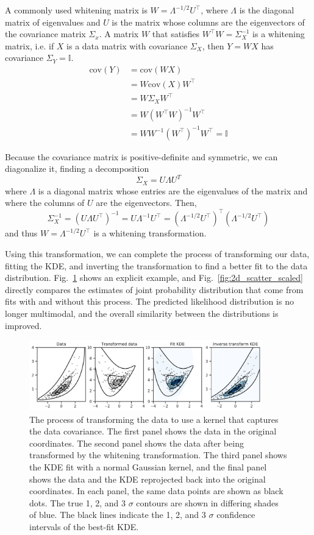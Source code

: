 A commonly used whitening matrix is $W = \Lambda^{-1/2}U^\top$, where $\Lambda$ is the diagonal matrix of eigenvalues and $U$ is the matrix whose columns are the eigenvectors of the covariance matrix $\Sigma_x$. A matrix $W$ that satisfies $W^\top W=\Sigma_X^{-1}$ is a whitening matrix, i.e. if $X$ is a data matrix with covariance $\Sigma_X$, then $Y=WX$ has covariance $\Sigma_Y=\mathbb{I}$.
\begin{align*}
    \textrm{cov}(Y) & = \textrm{cov}(WX)\\
    & = W\textrm{cov}(X)W^\top \\
    & = W\Sigma_X W^\top \\
    & = W(W^\top W)^{-1}W^\top \\
    & = WW^{-1}(W^\top)^{-1}W^\top = \mathbb{I}
\end{align*}

Because the covariance matrix is positive-definite and symmetric, we can diagonalize it, finding a decomposition
$$\Sigma_X = U\Lambda U^T$$
where $\Lambda$ is a diagonal matrix whose entries are the eigenvalues of the matrix and where the columns of $U$ are the eigenvectors. Then,
$$\Sigma_X^{-1}=(U\Lambda U^\top)^{-1} = U\Lambda^{-1}U^\top = (\Lambda^{-1/2}U^\top)^\top(\Lambda^{-1/2}U^\top)$$
and thus $W = \Lambda^{-1/2}U^\top$ is a whitening transformation.

Using this transformation, we can complete the process of transforming our data, fitting the KDE, and inverting the transformation to find a better fit to the data distribution. Fig.~\ref{fig:2d_rescaling_process} shows an explicit example, and Fig.~\ref{fig:2d_scatter_scaled} directly compares the estimates of joint probability distribution that come from fits with and without this process. The predicted likelihood distribution is no longer multimodal, and the overall similarity between the distributions is improved.

\begin{figure}
    \centering
    \includegraphics[width=0.9\textwidth]{figures/snemo_kde/2d_rescaling_process.pdf}
    \caption{The process of transforming the data to use a kernel that captures the data covariance. The first panel shows the data in the original coordinates. The second panel shows the data after being transformed by the whitening transformation. The third panel shows the KDE fit with a normal Gaussian kernel, and the final panel shows the data and the KDE reprojected back into the original coordinates. In each panel, the same data points are shown as black dots. The true 1, 2, and 3 $\sigma$ contours are shown in differing shades of blue. The black lines indicate the 1, 2, and 3 $\sigma$ confidence intervals of the best-fit KDE.}
    \label{fig:2d_rescaling_process}
\end{figure}

